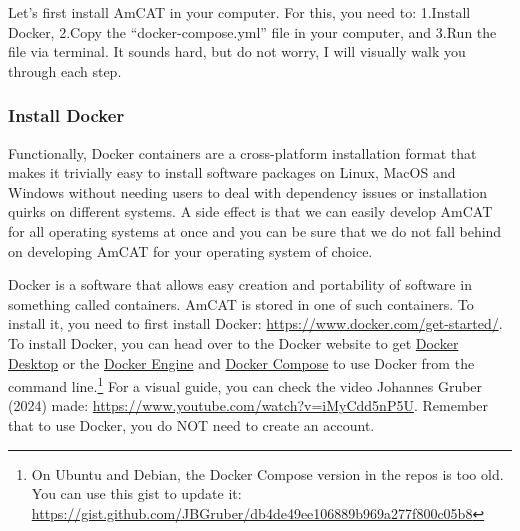 \documentclass[
  letterpaper,
  DIV=11,
  numbers=noendperiod]{scrreprt}
\begin{document}
Let's first install AmCAT in your computer. For this, you need to:
1.Install Docker, 2.Copy the ``docker-compose.yml'' file in your
computer, and 3.Run the file via terminal. It sounds hard, but do not
worry, I will visually walk you through each step.

\subsubsection{Install Docker}\label{install-docker}

\begin{tcolorbox}[enhanced jigsaw, coltitle=black, breakable, title=\textcolor{quarto-callout-tip-color}{\faLightbulb}\hspace{0.5em}{Why do we use Docker for installation?}, left=2mm, arc=.35mm, colback=white, colframe=quarto-callout-tip-color-frame, toptitle=1mm, opacityback=0, bottomrule=.15mm, rightrule=.15mm, leftrule=.75mm, opacitybacktitle=0.6, bottomtitle=1mm, titlerule=0mm, toprule=.15mm, colbacktitle=quarto-callout-tip-color!10!white]

Functionally, Docker containers are a cross-platform installation format
that makes it trivially easy to install software packages on Linux,
MacOS and Windows without needing users to deal with dependency issues
or installation quirks on different systems.\footnotemark{} A side
effect is that we can easily develop AmCAT for all operating systems at
once and you can be sure that we do not fall behind on developing AmCAT
for your operating system of choice.

\end{tcolorbox}


Docker is a software that allows easy creation and portability of
software in something called containers. AmCAT is stored in one of such
containers. To install it, you need to first install Docker:
\url{https://www.docker.com/get-started/}. To install Docker, you can
head over to the Docker website to get
\href{https://docs.docker.com/get-docker/}{Docker Desktop} or the
\href{https://docs.docker.com/engine/install/}{Docker Engine} and
\href{https://docs.docker.com/compose/install/}{Docker Compose} to use
Docker from the command line.\footnote{On Ubuntu and Debian, the Docker
  Compose version in the repos is too old. You can use this gist to
  update it:
  \url{https://gist.github.com/JBGruber/db4de49ee106889b969a277f800c05b8}}
For a visual guide, you can check the video Johannes Gruber (2024) made:
\url{https://www.youtube.com/watch?v=iMyCdd5nP5U}. Remember that to use
Docker, you do NOT need to create an account.
\end{document}
